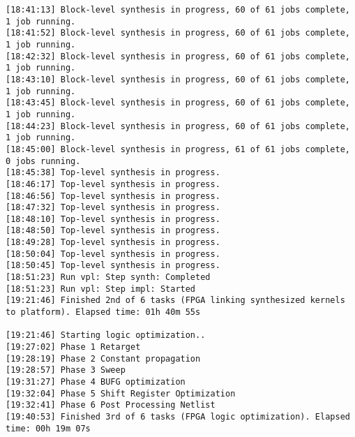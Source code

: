 \begin{center}
\begin{lstlisting}[label=lst:vlog,caption=Файл v++\_vinc.log]
[18:41:13] Block-level synthesis in progress, 60 of 61 jobs complete, 1 job running.
[18:41:52] Block-level synthesis in progress, 60 of 61 jobs complete, 1 job running.
[18:42:32] Block-level synthesis in progress, 60 of 61 jobs complete, 1 job running.
[18:43:10] Block-level synthesis in progress, 60 of 61 jobs complete, 1 job running.
[18:43:45] Block-level synthesis in progress, 60 of 61 jobs complete, 1 job running.
[18:44:23] Block-level synthesis in progress, 60 of 61 jobs complete, 1 job running.
[18:45:00] Block-level synthesis in progress, 61 of 61 jobs complete, 0 jobs running.
[18:45:38] Top-level synthesis in progress.
[18:46:17] Top-level synthesis in progress.
[18:46:56] Top-level synthesis in progress.
[18:47:32] Top-level synthesis in progress.
[18:48:10] Top-level synthesis in progress.
[18:48:50] Top-level synthesis in progress.
[18:49:28] Top-level synthesis in progress.
[18:50:04] Top-level synthesis in progress.
[18:50:45] Top-level synthesis in progress.
[18:51:23] Run vpl: Step synth: Completed
[18:51:23] Run vpl: Step impl: Started
[19:21:46] Finished 2nd of 6 tasks (FPGA linking synthesized kernels to platform). Elapsed time: 01h 40m 55s 

[19:21:46] Starting logic optimization..
[19:27:02] Phase 1 Retarget
[19:28:19] Phase 2 Constant propagation
[19:28:57] Phase 3 Sweep
[19:31:27] Phase 4 BUFG optimization
[19:32:04] Phase 5 Shift Register Optimization
[19:32:41] Phase 6 Post Processing Netlist
[19:40:53] Finished 3rd of 6 tasks (FPGA logic optimization). Elapsed time: 00h 19m 07s 


\end{lstlisting}
\end{center}
